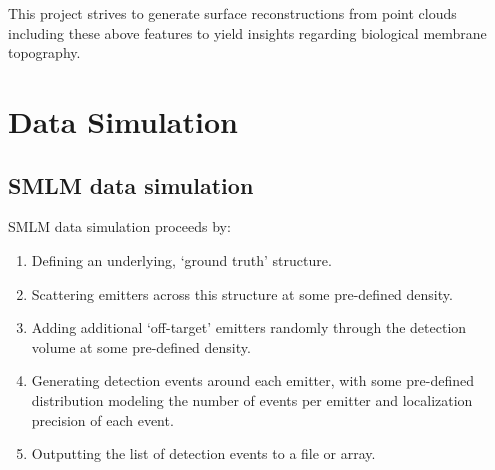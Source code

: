 \documentclass[10pt,a4paper]{article}
\begin{document}
This project strives to generate surface reconstructions from point clouds including these above features to yield insights regarding biological membrane topography. 

\section{Data Simulation}
\subsection{SMLM data simulation}
SMLM data simulation proceeds by:

\begin{enumerate}
	\item Defining an underlying, `ground truth' structure.
	\item Scattering emitters across this structure at some pre-defined density.
	\item Adding additional `off-target' emitters randomly through the detection volume at some pre-defined density. 
	\item Generating detection events around each emitter, with some pre-defined distribution modeling the number of events per emitter and localization precision of each event.  	
	\item Outputting the list of detection events to a file or array.
\end{enumerate}
\end{document}

